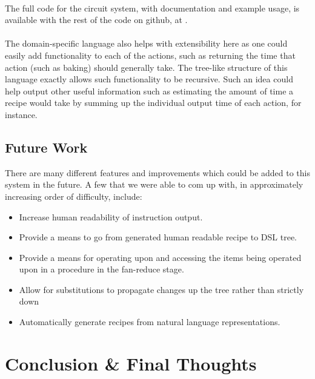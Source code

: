 \paragraph{}
The full code for the circuit system, with documentation and example usage, is available with the rest of the code on github, at .

\paragraph{}
The domain-specific language also helps with extensibility here as one could easily add functionality to each of the actions, such as returning the time that action (such as baking) should generally take. The tree-like structure of this language exactly allows such functionality to be recursive. Such an idea could help output other useful information such as estimating the amount of time a recipe would take by summing up the individual output time of each action, for instance.

\subsection{Future Work}
There are many different features and improvements which could be added to this system in the future. A few that we were able to com up with, in approximately increasing order of difficulty, include:
\begin{itemize}
\item Increase human readability of instruction output.
\item Provide a means to go from generated human readable recipe to DSL tree.
\item Provide a means for operating upon and accessing the items being operated upon in a procedure in the fan-reduce stage.
\item Allow for substitutions to propagate changes up the tree rather than strictly down
\item Automatically generate recipes from natural language representations.
\end{itemize}

\newpage
\section{Conclusion \& Final Thoughts}


